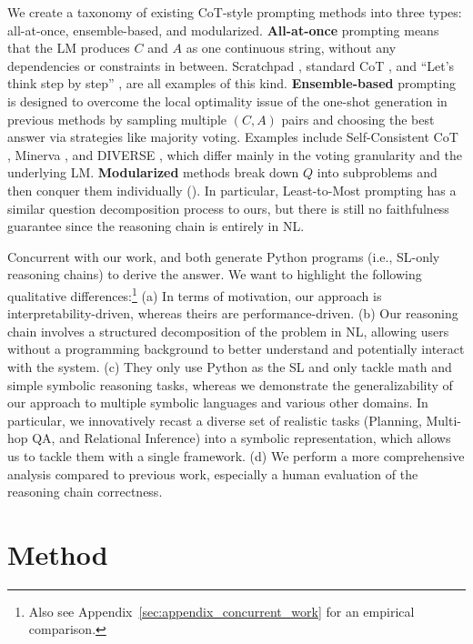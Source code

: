 \documentclass[11pt]{article}
\begin{document}
We create a taxonomy of existing CoT-style prompting methods into three types: all-at-once, ensemble-based, and modularized. \textbf{All-at-once} prompting means that the LM produces $C$ and $A$ as one continuous string, without any dependencies or constraints in between. Scratchpad \cite{nye_show_2021}, standard CoT \cite{wei_chain_2022}, and ``Let's think step by step'' \cite{kojima_large_2022}, are all examples of this kind. \textbf{Ensemble-based} prompting is designed to overcome the local optimality issue of the one-shot generation in previous methods by sampling multiple $(C,A)$ pairs and choosing the best answer via strategies like majority voting. Examples include Self-Consistent CoT \cite{wang_self-consistency_2022}, Minerva \cite{lewkowycz_solving_2022}, and DIVERSE \cite{li_advance_2022}, which differ mainly in the voting granularity and the underlying LM. \textbf{Modularized} methods break down $Q$ into subproblems and then conquer them individually (\citealp[i.a.]{jung_maieutic_2022, qian_limitations_2022}). In particular, Least-to-Most prompting \cite{zhou_least--most_2022} has a similar question decomposition process to ours, but there is still no faithfulness guarantee since the reasoning chain is entirely in NL.

Concurrent with our work, \citet{chen_program_2022} and \citet{gao_pal_2022} both generate Python programs (i.e., SL-only reasoning chains) to derive the answer. We want to highlight the following qualitative differences:\footnote{Also see Appendix~\ref{sec:appendix_concurrent_work} for an empirical comparison.} (a) In terms of motivation, our approach is interpretability-driven, whereas theirs are performance-driven. (b) Our reasoning chain involves a structured decomposition of the problem in NL, allowing users without a programming background to better understand and potentially interact with the system. (c) They only use Python as the SL and only tackle math and simple symbolic reasoning tasks, whereas we demonstrate the generalizability of our approach to multiple symbolic languages and various other domains. In particular, we innovatively recast a diverse set of realistic tasks (Planning, Multi-hop QA, and Relational Inference) into a symbolic representation, which allows us to tackle them with a single framework. (d) We perform a more comprehensive analysis compared to previous work, especially a human evaluation of the reasoning chain correctness.

\section{Method}
\end{document}
